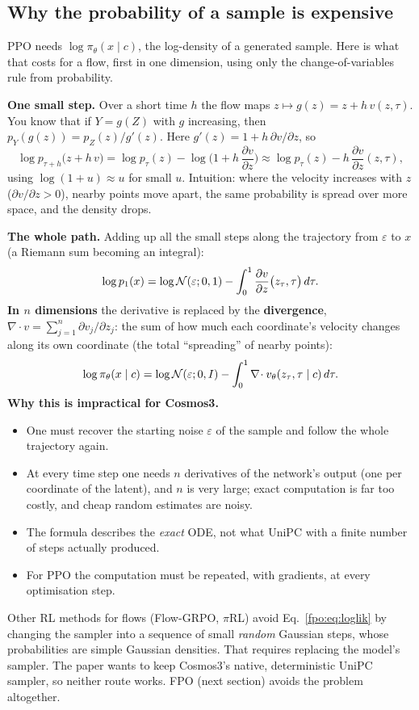 \subsection{Why the probability of a sample is expensive}\label{fpo:sec:loglik}
PPO needs $\log\pi_\theta(x\mid c)$, the log-density of a generated sample. Here is what that costs for a flow, first in one dimension, using only the change-of-variables rule from probability.

\textbf{One small step.} Over a short time $h$ the flow maps $z\mapsto g(z)=z+h\,v(z,\tau)$. You know that if $Y=g(Z)$ with $g$ increasing, then $p_Y(g(z))=p_Z(z)/g'(z)$. Here $g'(z)=1+h\,\partial v/\partial z$, so
\[
\log p_{\tau+h}\big(z+h\,v\big)=\log p_\tau(z)-\log\Big(1+h\,\frac{\partial v}{\partial z}\Big)\approx\log p_\tau(z)-h\,\frac{\partial v}{\partial z}(z,\tau),
\]
using $\log(1+u)\approx u$ for small $u$. Intuition: where the velocity increases with $z$ ($\partial v/\partial z>0$), nearby points move apart, the same probability is spread over more space, and the density drops.

\textbf{The whole path.} Adding up all the small steps along the trajectory from $\varepsilon$ to $x$ (a Riemann sum becoming an integral):
\begin{equation}
\log p_1(x)=\log\mathcal{N}(\varepsilon;0,1)-\int_0^1\frac{\partial v}{\partial z}\big(z_\tau,\tau\big)\,d\tau .
\end{equation}
\textbf{In $n$ dimensions} the derivative is replaced by the \textbf{divergence}, $\nabla\!\cdot v=\sum_{j=1}^n\partial v_j/\partial z_j$: the sum of how much each coordinate's velocity changes along its own coordinate (the total ``spreading'' of nearby points):
\begin{equation}
\log\pi_\theta(x\mid c)=\log\mathcal{N}(\varepsilon;0,I)-\int_0^1\nabla\!\cdot v_\theta(z_\tau,\tau\mid c)\,d\tau .
\label{fpo:eq:loglik}
\end{equation}
\textbf{Why this is impractical for Cosmos3.}
\begin{itemize}
\item One must recover the starting noise $\varepsilon$ of the sample and follow the whole trajectory again.
\item At every time step one needs $n$ derivatives of the network's output (one per coordinate of the latent), and $n$ is very large; exact computation is far too costly, and cheap random estimates are noisy.
\item The formula describes the \emph{exact} ODE, not what UniPC with a finite number of steps actually produced.
\item For PPO the computation must be repeated, with gradients, at every optimisation step.
\end{itemize}
Other RL methods for flows (Flow-GRPO, $\pi$RL) avoid Eq.~\eqref{fpo:eq:loglik} by changing the sampler into a sequence of small \emph{random} Gaussian steps, whose probabilities are simple Gaussian densities. That requires replacing the model's sampler. The paper wants to keep Cosmos3's native, deterministic UniPC sampler, so neither route works. FPO (next section) avoids the problem altogether.

